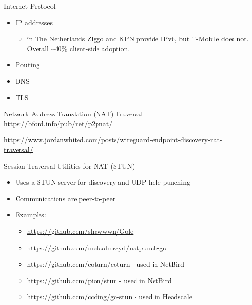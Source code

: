\hypertarget{notes__02021-internet-protocol.md}{}
\begin{block}{Internet Protocol}
\protect\hypertarget{notes__02021-internet-protocol.md__internet-protocol}{}
\begin{itemize}
\item
  IP addresses

  \begin{itemize}
  \tightlist
  \item
    in The Netherlands Ziggo and KPN provide IPv6, but T-Mobile does
    not. Overall \textasciitilde40\% client-side adoption.
  \end{itemize}
\item
  Routing
\item
  DNS
\item
  TLS
\end{itemize}

\begin{block}{Network Address Translation (NAT) Traversal}
\protect\hypertarget{notes__02021-internet-protocol.md__network-address-translation-nat-traversal}{}
\url{https://bford.info/pub/net/p2pnat/}

\url{https://www.jordanwhited.com/posts/wireguard-endpoint-discovery-nat-traversal/}
\end{block}

\begin{block}{Session Traversal Utilities for NAT (STUN)}
\protect\hypertarget{notes__02021-internet-protocol.md__session-traversal-utilities-for-nat-stun}{}
\begin{itemize}
\item
  Uses a STUN server for discovery and UDP hole-punching
\item
  Communications are peer-to-peer
\item
  Examples:

  \begin{itemize}
  \item
    \url{https://github.com/shawwwn/Gole}
  \item
    \url{https://github.com/malcolmseyd/natpunch-go}
  \item
    \url{https://github.com/coturn/coturn} - used in NetBird
  \item
    \url{https://github.com/pion/stun} - used in NetBird
  \item
    \url{https://github.com/ccding/go-stun} - used in Headscale
  \end{itemize}
\end{itemize}
\end{block}


\end{block}
